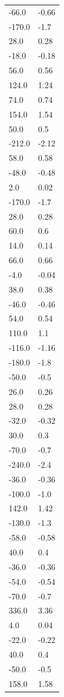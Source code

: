 \begin{longtable}{ll}
-66.0 & -0.66 \\
-170.0 & -1.7 \\
28.0 & 0.28 \\
-18.0 & -0.18 \\
56.0 & 0.56 \\
124.0 & 1.24 \\
74.0 & 0.74 \\
154.0 & 1.54 \\
50.0 & 0.5 \\
-212.0 & -2.12 \\
58.0 & 0.58 \\
-48.0 & -0.48 \\
2.0 & 0.02 \\
-170.0 & -1.7 \\
28.0 & 0.28 \\
60.0 & 0.6 \\
14.0 & 0.14 \\
66.0 & 0.66 \\
-4.0 & -0.04 \\
38.0 & 0.38 \\
-46.0 & -0.46 \\
54.0 & 0.54 \\
110.0 & 1.1 \\
-116.0 & -1.16 \\
-180.0 & -1.8 \\
-50.0 & -0.5 \\
26.0 & 0.26 \\
28.0 & 0.28 \\
-32.0 & -0.32 \\
30.0 & 0.3 \\
-70.0 & -0.7 \\
-240.0 & -2.4 \\
-36.0 & -0.36 \\
-100.0 & -1.0 \\
142.0 & 1.42 \\
-130.0 & -1.3 \\
-58.0 & -0.58 \\
40.0 & 0.4 \\
-36.0 & -0.36 \\
-54.0 & -0.54 \\
-70.0 & -0.7 \\
336.0 & 3.36 \\
4.0 & 0.04 \\
-22.0 & -0.22 \\
40.0 & 0.4 \\
-50.0 & -0.5 \\
158.0 & 1.58 \\

\end{longtable}

